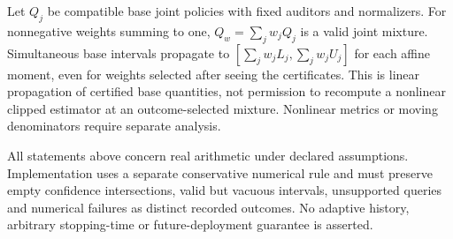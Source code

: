 \begin{corollary}
\label{cor:post-mixtures}
Let $Q_j$ be compatible base joint policies with fixed auditors and normalizers.
For nonnegative weights summing to one, $Q_w=\sum_jw_jQ_j$ is a valid joint
mixture. Simultaneous base intervals propagate to
$[\sum_jw_jL_j,\sum_jw_jU_j]$ for each affine moment, even for weights selected
after seeing the certificates. This is linear propagation of certified base
quantities, not permission to recompute a nonlinear clipped estimator at an
outcome-selected mixture. Nonlinear metrics or moving denominators require
separate analysis.
\end{corollary}

All statements above concern real arithmetic under declared assumptions.
Implementation uses a separate conservative numerical rule and must preserve
empty confidence intersections, valid but vacuous intervals, unsupported
queries and numerical failures as distinct recorded outcomes. No adaptive
history, arbitrary stopping-time or future-deployment guarantee is asserted.
